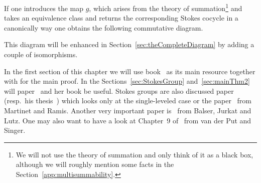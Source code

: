 If one introduces the map $g$, which arises from the theory of
summation\footnote{We will not use the theory of summation and only think of it
  as a black box, although we will roughly mention some facts in the
  Section~\ref{app:multisummability}.} and takes an equivalence
class and returns the corresponding Stokes cocycle in a canonically way one
obtains the following commutative diagram.
\begin{center}
\end{center}\label{page:ofPreDiagram}
This diagram will be enhanced in Section~\ref{sec:theCompleteDiagram} by
adding a couple of isomorphisms.

In the first section of this chapter we will use
 book~\cite[section II]{sabbah2007isomonodromic} as its main
resource together with \cite{babbitt1989local} for the main proof.
In the Sections~\ref{sec:StokesGroup} and~\ref{sec:mainThm2} will
 paper~\cite{Loday1994} and her book
\cite[Sec.4]{Loday2014} be useful.
Stokes groups are also discussed  paper~\cite{boalch} (resp.\
his thesis~\cite{thboalch}) which looks only at the single-leveled case or the
paper~\cite{Martinet1991} from Martinet and Ramis.
Another very important paper is~\cite{BJL1979Birkhoff} from Balser, Jurkat and
Lutz.
One may also want to have a look at Chapter~9 of~\cite{van2003galois} from van
der Put and Singer.

